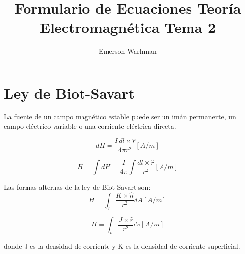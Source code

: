 \documentclass[12pt,a4paper,twocolumn]{article}
\title{Formulario de Ecuaciones Teoría Electromagnética Tema 2}
\author{Emerson Warhman}
\date{}
\begin{document}
\small
\maketitle
\section*{Ley de Biot-Savart}

La fuente de un campo magnético estable puede ser un imán permanente, un campo eléctrico variable o una corriente eléctrica directa.

\begin{equation*}
    dH = \frac{I \, dl \times \hat{r}}{4\pi r^2} [A/m]
\end{equation*}

\begin{equation*}
    H = \int dH = \frac{I}{4\pi} \int \frac{dl \times \hat{r}}{r^2} [A/m]
\end{equation*}

Las formas alternas de la ley de Biot-Savart son:
\begin{equation*}
    H=\int_s \frac{K \times \hat{n}}{r^2} dA [A/m]
\end{equation*}

\begin{equation*}
    H=\int_v \frac{J \times \hat{r}}{r^2} dv [A/m]
\end{equation*}

donde J es la densidad de corriente y K es la densidad de corriente superficial.
\end{document}
